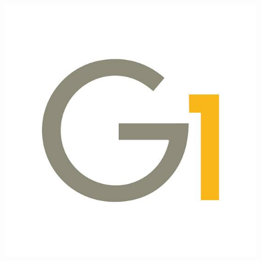 \documentclass[]{beamer}
\begin{document}
\begin{frame}
\begin{itemize}
\begin{columns}
\begin{column}{.4\textwidth}
\begin{figure}
        \includegraphics[width=\columnwidth]{img/g1.jpg}
      \end{figure}
    \end{column}
  \end{columns}
\end{itemize}
\end{frame}
\end{document}
